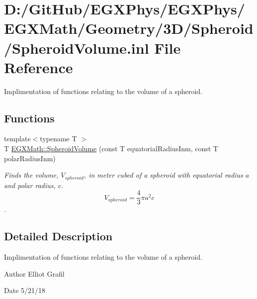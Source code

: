 \hypertarget{_spheroid_volume_8inl}{}\section{D\+:/\+Git\+Hub/\+E\+G\+X\+Phys/\+E\+G\+X\+Phys/\+E\+G\+X\+Math/\+Geometry/3\+D/\+Spheroid/\+Spheroid\+Volume.inl File Reference}
\label{_spheroid_volume_8inl}


Implimentation of functions relating to the volume of a spheroid.  


\subsection*{Functions}
\begin{DoxyCompactItemize}
\item 
{\footnotesize template$<$typename T $>$ }\\T \mbox{\hyperlink{group___e_g_x_math-_geometry-3_d-_spheroid-_volume_ga12125484235e94b8f2580f3476b05b92}{E\+G\+X\+Math\+::\+Spheroid\+Volume}} (const T equatorial\+Radius\+Inm, const T polar\+Radius\+Inm)
\begin{DoxyCompactList}\small\item\em Finds the volume, $V_{spheroid}$, in meter cubed of a spheroid with equatorial radius $a$ and polar radius, $c$. \[ V_{spheroid}=\frac{4}{3}\pi a^2 c \]. \end{DoxyCompactList}\end{DoxyCompactItemize}


\subsection{Detailed Description}
Implimentation of functions relating to the volume of a spheroid. 

\begin{DoxyAuthor}{Author}
Elliot Grafil 
\end{DoxyAuthor}
\begin{DoxyDate}{Date}
5/21/18 
\end{DoxyDate}
